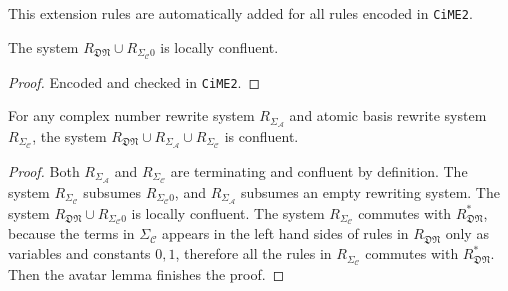 \documentclass[manuscript, review, timestamp]{acmart}
\begin{document}
This extension rules are automatically added for all rules encoded in \texttt{CiME2}.

\begin{proposition}
  The system $R_\mathfrak{DN} \cup R_{\Sigma_\mathcal{C}0}$ is locally confluent.
\end{proposition}
\begin{proof}
  Encoded and checked in \texttt{CiME2}.
\end{proof}


\begin{lemma}
  For any complex number rewrite system $R_{\Sigma_\mathcal{A}}$ and atomic basis rewrite system $R_{\Sigma_\mathcal{C}}$, the system $R_\mathfrak{DN} \cup R_{\Sigma_\mathcal{A}} \cup R_{\Sigma_\mathcal{C}}$ is confluent.
\end{lemma}
\begin{proof}
  Both $R_{\Sigma_\mathcal{A}}$ and $R_{\Sigma_\mathcal{C}}$ are terminating and confluent by definition. 
  The system $R_{\Sigma_\mathcal{C}}$ subsumes $R_{\Sigma_\mathcal{C}0}$, and $R_{\Sigma_\mathcal{A}}$ subsumes an empty rewriting system. 
  The system $R_\mathfrak{DN} \cup R_{\Sigma_\mathcal{C}0}$ is locally confluent. 
  The system $R_{\Sigma_\mathcal{C}}$ commutes with $R_\mathfrak{DN}^*$, because the terms in $\Sigma_\mathcal{C}$ appears in the left hand sides of rules in $R_\mathfrak{DN}$ only as variables and constants $0, 1$, therefore all the rules in $R_{\Sigma_\mathcal{C}}$ commutes with $R_\mathfrak{DN}^*$. 
  Then the avatar lemma finishes the proof.
\end{proof}





\end{document}
